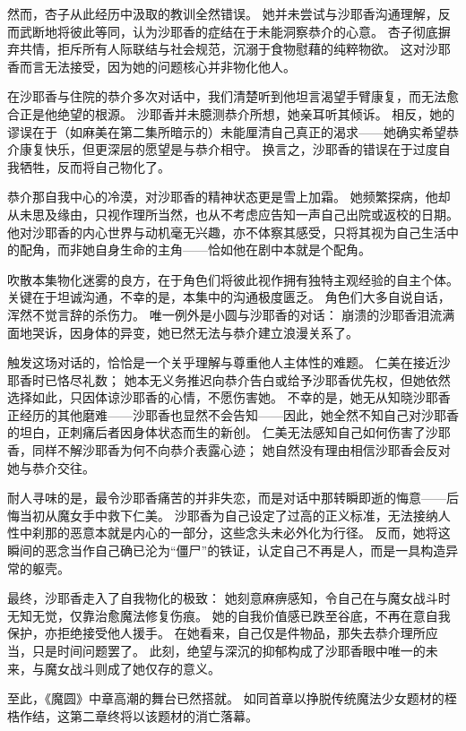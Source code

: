 然而，杏子从此经历中汲取的教训全然错误。
她并未尝试与沙耶香沟通理解，反而武断地将彼此等同，认为沙耶香的症结在于未能洞察恭介的心意。
杏子彻底摒弃共情，拒斥所有人际联结与社会规范，沉溺于食物慰藉的纯粹物欲。
这对沙耶香而言无法接受，因为她的问题核心并非物化他人。

在沙耶香与住院的恭介多次对话中，我们清楚听到他坦言渴望手臂康复，而无法愈合正是他绝望的根源。
沙耶香并未臆测恭介所想，她亲耳听其倾诉。
相反，她的谬误在于（如麻美在第二集所暗示的）未能厘清自己真正的渴求——她确实希望恭介康复快乐，但更深层的愿望是与恭介相守。
换言之，沙耶香的错误在于过度自我牺牲，反而将自己物化了。

恭介那自我中心的冷漠，对沙耶香的精神状态更是雪上加霜。
她频繁探病，他却从未思及缘由，只视作理所当然，也从不考虑应告知一声自己出院或返校的日期。
他对沙耶香的内心世界与动机毫无兴趣，亦不体察其感受，只将其视为自己生活中的配角，而非她自身生命的主角——恰如他在剧中本就是个配角。

吹散本集物化迷雾的良方，在于角色们将彼此视作拥有独特主观经验的自主个体。
关键在于坦诚沟通，不幸的是，本集中的沟通极度匮乏。
角色们大多自说自话，浑然不觉言辞的杀伤力。
唯一例外是小圆与沙耶香的对话：
崩溃的沙耶香泪流满面地哭诉，因身体的异变，她已然无法与恭介建立浪漫关系了。

触发这场对话的，恰恰是一个关乎理解与尊重他人主体性的难题。
仁美在接近沙耶香时已恪尽礼数；
她本无义务推迟向恭介告白或给予沙耶香优先权，但她依然选择如此，只因体谅沙耶香的心情，不愿伤害她。
不幸的是，她无从知晓沙耶香正经历的其他磨难——沙耶香也显然不会告知——因此，她全然不知自己对沙耶香的坦白，正刺痛后者因身体状态而生的新创。
仁美无法感知自己如何伤害了沙耶香，同样不解沙耶香为何不向恭介表露心迹；
她自然没有理由相信沙耶香会反对她与恭介交往。

耐人寻味的是，最令沙耶香痛苦的并非失恋，而是对话中那转瞬即逝的悔意——后悔当初从魔女手中救下仁美。
沙耶香为自己设定了过高的正义标准，无法接纳人性中刹那的恶意本就是内心的一部分，这些念头未必外化为行径。
反而，她将这瞬间的恶念当作自己确已沦为“僵尸”的铁证，认定自己不再是人，而是一具构造异常的躯壳。

最终，沙耶香走入了自我物化的极致：
她刻意麻痹感知，令自己在与魔女战斗时无知无觉，仅靠治愈魔法修复伤痕。
她的自我价值感已跌至谷底，不再在意自我保护，亦拒绝接受他人援手。
在她看来，自己仅是件物品，那失去恭介理所应当，只是时间问题罢了。
此刻，绝望与深沉的抑郁构成了沙耶香眼中唯一的未来，与魔女战斗则成了她仅存的意义。

至此，《魔圆》中章高潮的舞台已然搭就。
如同首章以挣脱传统魔法少女题材的桎梏作结，这第二章终将以该题材的消亡落幕。
